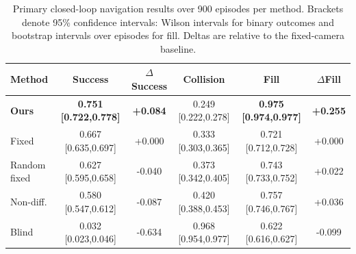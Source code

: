 \begin{table}[t]
\centering
\small
\begin{tabular}{lccccc}
\toprule
Method & Success & $\Delta$Success & Collision & Fill & $\Delta$Fill \\
\midrule
\textbf{Ours} & \textbf{0.751 [0.722,0.778]} & \textbf{+0.084} & 0.249 [0.222,0.278] & \textbf{0.975 [0.974,0.977]} & \textbf{+0.255} \\
Fixed & 0.667 [0.635,0.697] & +0.000 & 0.333 [0.303,0.365] & 0.721 [0.712,0.728] & +0.000 \\
Random fixed & 0.627 [0.595,0.658] & -0.040 & 0.373 [0.342,0.405] & 0.743 [0.733,0.752] & +0.022 \\
Non-diff. & 0.580 [0.547,0.612] & -0.087 & 0.420 [0.388,0.453] & 0.757 [0.746,0.767] & +0.036 \\
Blind & 0.032 [0.023,0.046] & -0.634 & 0.968 [0.954,0.977] & 0.622 [0.616,0.627] & -0.099 \\
\bottomrule
\end{tabular}
\caption{Primary closed-loop navigation results over 900 episodes per method. Brackets denote 95\% confidence intervals: Wilson intervals for binary outcomes and bootstrap intervals over episodes for fill. Deltas are relative to the fixed-camera baseline.}
\label{tab:journal_main_navigation}
\end{table}
